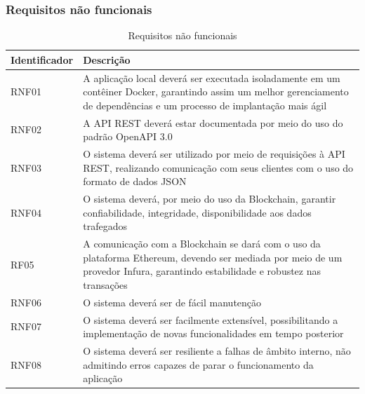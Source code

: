 \subsubsection{Requisitos não funcionais}
\begin{table}[H]
    \centering
    \begin{tabular}{ | p{3cm} | p{10cm} |}
        \hline
        \textbf{Identificador} & \textbf{Descrição}\\
        \hline
        
        RNF01 & A aplicação local deverá ser executada isoladamente em um contêiner Docker, garantindo assim um melhor gerenciamento de dependências e um processo de implantação mais ágil \\
        \hline
        
        RNF02 & A API REST deverá estar documentada por meio do uso do padrão OpenAPI 3.0 \\
        \hline

        RNF03 & O sistema deverá ser utilizado por meio de requisições à API REST, realizando comunicação com seus clientes com o uso do formato de dados JSON \\
        \hline
        
        RNF04 & O sistema deverá, por meio do uso da Blockchain, garantir confiabilidade, integridade, disponibilidade aos dados trafegados \\
        \hline

        RF05 & A comunicação com a Blockchain se dará com o uso da plataforma Ethereum, devendo ser mediada por meio de um provedor Infura, garantindo estabilidade e robustez nas transações
        \\
        \hline

        RNF06 & O sistema deverá ser de fácil manutenção \\
        \hline

        RNF07 & O sistema deverá ser facilmente extensível, possibilitando a implementação de novas funcionalidades em tempo posterior \\
        \hline

        RNF08 & O sistema deverá ser resiliente a falhas de âmbito interno, não admitindo erros capazes de parar o funcionamento da aplicação \\
        \hline
    \end{tabular}
    \caption{Requisitos não funcionais}
    \label{tab:my_label}
\end{table}

